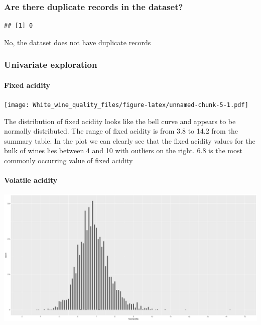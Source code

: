 \documentclass[]{article}
\let\oldparagraph\paragraph
\renewcommand{\paragraph}[1]{\oldparagraph{#1}\mbox{}}
\begin{document}
\subsubsection{Are there duplicate records in the
dataset?}\label{are-there-duplicate-records-in-the-dataset}

\begin{verbatim}
## [1] 0
\end{verbatim}

No, the dataset does not have duplicate records

\subsubsection{Univariate exploration}\label{univariate-exploration}

\paragraph{Fixed acidity}\label{fixed-acidity}

\texttt{[image: White\_wine\_quality\_files/figure-latex/unnamed-chunk-5-1.pdf]}

The distribution of fixed acidity looks like the bell curve and appears
to be normally distributed. The range of fixed acidity is from 3.8 to
14.2 from the summary table. In the plot we can clearly see that the
fixed acidity values for the bulk of wines lies between 4 and 10 with
outliers on the right. 6.8 is the most commonly occurring value of fixed
acidity

\paragraph{Volatile acidity}\label{volatile-acidity}

\includegraphics{White_wine_quality_files/figure-latex/unnamed-chunk-6-1.pdf}
\end{document}
